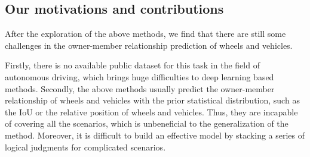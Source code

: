 \documentclass{article}
\begin{document}


\subsection{Our motivations and contributions}
After the exploration of the above methods, we find that there are still some challenges in the owner-member relationship prediction of wheels and vehicles.

Firstly, there is no available public dataset for this task in the field of autonomous driving, which brings huge difficulties to deep learning based methods. Secondly, the above methods usually predict the owner-member relationship of wheels and vehicles with the prior statistical distribution, such as the IoU or the relative position of wheels and vehicles. Thus, they are incapable of covering all the scenarios, which is unbeneficial to the generalization of the method. Moreover, it is difficult to build an effective model by stacking a series of logical judgments for complicated scenarios.
\end{document}
